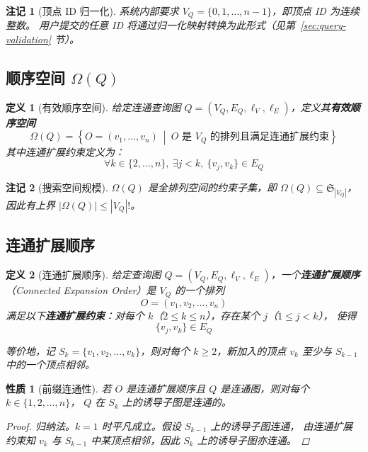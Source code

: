 \documentclass[12pt,a4paper]{article}
\newtheorem{definition}{定义}[section]
\newtheorem{property}{性质}[section]
\newtheorem{remark}{注记}[section]
\begin{document}
\begin{remark}[顶点 ID 归一化]
系统内部要求 $V_Q = \{0, 1, \dots, n{-}1\}$，即顶点 ID 为连续整数。
用户提交的任意 ID 将通过归一化映射转换为此形式（见第~\ref{sec:query-validation} 节）。
\end{remark}

\subsection{顺序空间 $\Omega(Q)$}
\label{sec:formal-omega}

\begin{definition}[有效顺序空间]
给定连通查询图 $Q=(V_Q,E_Q,\ell_V,\ell_E)$，定义其\textbf{有效顺序空间}
\[
  \Omega(Q)=\left\{O=(v_1,\dots,v_n)\ \middle|\ O \text{ 是 }V_Q\text{ 的排列且满足连通扩展约束}\right\}
\]
其中连通扩展约束定义为：
\[
\forall k\in\{2,\dots,n\},\ \exists j<k,\ \{v_j,v_k\}\in E_Q
\]
\end{definition}

\begin{remark}[搜索空间规模]
$\Omega(Q)$ 是全排列空间的约束子集，即 $\Omega(Q)\subseteq \mathfrak{S}_{|V_Q|}$，
因此有上界 $|\Omega(Q)| \le |V_Q|!$。
\end{remark}

\subsection{连通扩展顺序}
\label{sec:formal-order}

\begin{definition}[连通扩展顺序]
\label{def:order}
给定查询图 $Q = (V_Q, E_Q, \ell_V, \ell_E)$，一个\textbf{连通扩展顺序}
（Connected Expansion Order）是 $V_Q$ 的一个排列
\[
  O = (v_1, v_2, \dots, v_n)
\]
满足以下\textbf{连通扩展约束}：对每个 $k$（$2 \le k \le n$），存在某个 $j$（$1 \le j < k$），
使得
\[
  \{v_j, v_k\} \in E_Q
\]

等价地，记 $S_k = \{v_1, v_2, \dots, v_k\}$，则对每个 $k \ge 2$，新加入的顶点 $v_k$
至少与 $S_{k-1}$ 中的一个顶点相邻。
\end{definition}

\begin{property}[前缀连通性]
\label{prop:prefix-connected}
若 $O$ 是连通扩展顺序且 $Q$ 是连通图，则对每个 $k \in \{1, 2, \dots, n\}$，
$Q$ 在 $S_k$ 上的诱导子图是连通的。

\begin{proof}
归纳法。$k=1$ 时平凡成立。假设 $S_{k-1}$ 上的诱导子图连通，
由连通扩展约束知 $v_k$ 与 $S_{k-1}$ 中某顶点相邻，因此 $S_k$ 上的诱导子图亦连通。
\end{proof}
\end{property}
\end{document}
